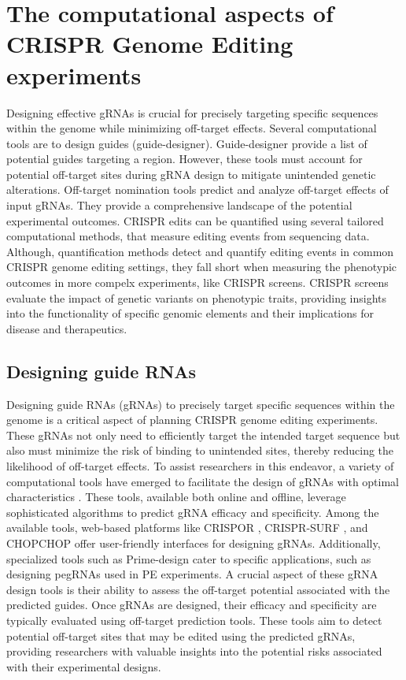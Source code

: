 \documentclass[a4paper, titlepage, openright]{book}
\begin{document}
\section{The computational aspects of CRISPR Genome Editing experiments}
Designing effective gRNAs is crucial for precisely targeting specific sequences within the genome while minimizing off-target effects. Several computational tools are to design guides (guide-designer). Guide-designer provide a list of potential guides targeting a region. However, these tools must account for potential off-target sites during gRNA design to mitigate unintended genetic alterations. Off-target nomination tools predict and analyze off-target effects of input gRNAs. They provide a comprehensive landscape of the potential experimental outcomes. CRISPR edits can be quantified using several tailored computational methods, that measure editing events from sequencing data. Although, quantification methods detect and quantify editing events in common CRISPR genome editing settings, they fall short when measuring the phenotypic outcomes in more compelx experiments, like CRISPR screens. CRISPR screens evaluate the impact of genetic variants on phenotypic traits, providing insights into the functionality of specific genomic elements and their implications for disease and therapeutics. 

\subsection{Designing guide RNAs}
Designing guide RNAs (gRNAs) to precisely target specific sequences within the genome is a critical aspect of planning CRISPR genome editing experiments. These gRNAs not only need to efficiently target the intended target sequence but also must minimize the risk of binding to unintended sites, thereby reducing the likelihood of off-target effects. To assist researchers in this endeavor, a variety of computational tools have emerged to facilitate the design of gRNAs with optimal characteristics \citep{li2023computational}. These tools, available both online and offline, leverage sophisticated algorithms to predict gRNA efficacy and specificity. Among the available tools, web-based platforms like CRISPOR \citep{haeussler2016evaluation}, CRISPR-SURF \citep{hsu2018crispr}, and CHOPCHOP \citep{montague2014chopchop} offer user-friendly interfaces for designing gRNAs. Additionally, specialized tools such as Prime-design \citep{hsu2021primedesign} cater to specific applications, such as designing pegRNAs used in PE experiments. A crucial aspect of these gRNA design tools is their ability to assess the off-target potential associated with the predicted guides. Once gRNAs are designed, their efficacy and specificity are typically evaluated using off-target prediction tools. These tools aim to detect potential off-target sites that may be edited using the predicted gRNAs, providing researchers with valuable insights into the potential risks associated with their experimental designs.
\end{document}
